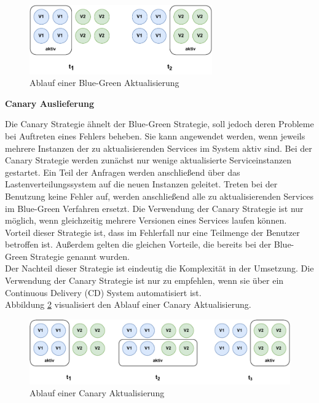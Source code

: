 \begin{figure}[H]
  \centering
  \includegraphics[width=0.7\textwidth]{images/blue-green.pdf}
  \caption{Ablauf einer Blue-Green Aktualisierung}
  \label{fig:blue-green}
\end{figure}

\textbf{Canary Auslieferung}

Die Canary Strategie ähnelt der Blue-Green Strategie, soll jedoch deren Probleme bei Auftreten eines Fehlers beheben. Sie kann angewendet werden, wenn jeweils mehrere Instanzen der zu aktualisierenden Services im System aktiv sind. Bei der Canary Strategie werden zunächst nur wenige aktualisierte Serviceinstanzen gestartet. Ein Teil der Anfragen werden anschließend über das Lastenverteilungssystem auf die neuen Instanzen geleitet. Treten bei der Benutzung keine Fehler auf, werden anschließend alle zu aktualisierenden Services im Blue-Green Verfahren ersetzt. Die Verwendung der Canary Strategie ist nur möglich, wenn gleichzeitig mehrere Versionen eines Services laufen können.\\
Vorteil dieser Strategie ist, dass im Fehlerfall nur eine Teilmenge der Benutzer betroffen ist. Außerdem gelten die gleichen Vorteile, die bereits bei der Blue-Green Strategie genannt wurden.\\
Der Nachteil dieser Strategie ist eindeutig die Komplexität in der Umsetzung. Die Verwendung der Canary Strategie ist nur zu empfehlen, wenn sie über ein Continuous Delivery (CD) System automatisiert ist.\\
Abbildung \ref{fig:canary} visualisiert den Ablauf einer Canary Aktualisierung.\\

\begin{figure}[H]
  \centering
  \includegraphics[width=\textwidth]{images/canary.pdf}
  \caption{Ablauf einer Canary Aktualisierung}
  \label{fig:canary}
\end{figure}


